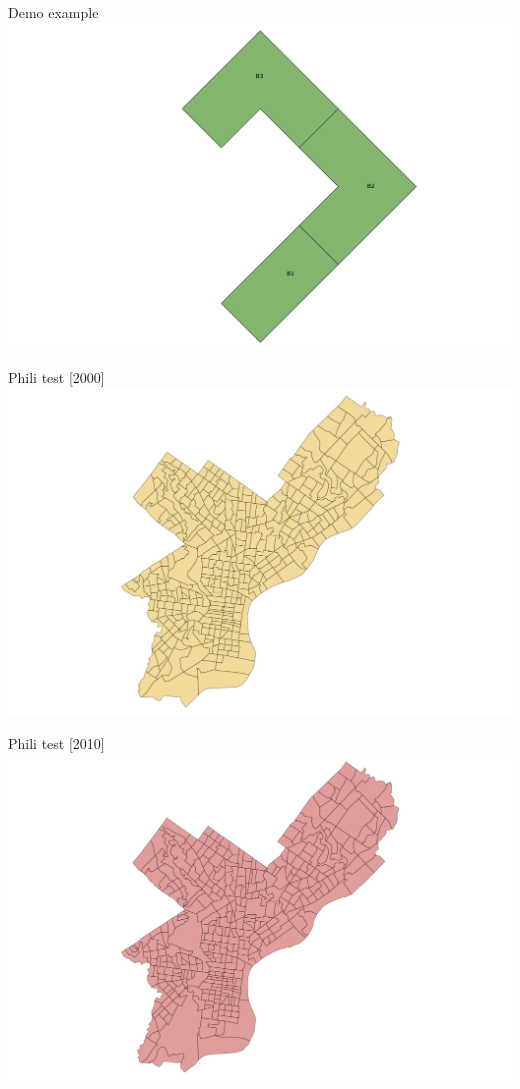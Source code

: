 \documentclass{beamer}
\begin{document}
\begin{frame}{Demo example}
    \centering 
    \includegraphics[width=\linewidth]{figures/Demo07} 
\end{frame}

\begin{frame}{Phili test [2000]}
    \centering 
    \includegraphics[trim=6cm 0cm 6cm 0cm, clip, width=0.6\linewidth]{figures/phili2000} 
\end{frame}

\begin{frame}{Phili test [2010]}
    \centering 
    \includegraphics[trim=6cm 0cm 6cm 0cm, clip, width=0.6\linewidth]{figures/phili2010} 
\end{frame}
\end{document}
